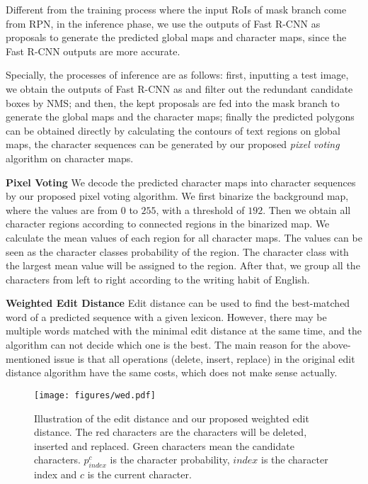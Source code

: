 \documentclass[runningheads]{llncs}
\begin{document}
Different from the training process where the input RoIs of mask branch come from RPN, in the inference phase, we use the outputs of Fast R-CNN as proposals to generate the predicted global maps and character maps, since the Fast R-CNN outputs are more accurate. 

Specially, the processes of inference are as follows: first, inputting a test image, we obtain the outputs of Fast R-CNN as \cite{ren2015faster} and filter out the redundant candidate boxes by NMS; and then, the kept proposals are fed into the mask branch to generate the global maps and the character maps; finally the predicted polygons can be obtained directly by calculating the contours of text regions on global maps, the character sequences can be generated by our proposed \textit{pixel voting} algorithm on character maps.










\noindent\textbf{Pixel Voting} We decode the predicted character maps into character sequences by our proposed pixel voting algorithm. We first binarize the background map, where the values are from $0$ to $255$, with a threshold of $192$. 
Then we obtain all character regions according to connected regions in the binarized map. We calculate the mean values of each region for all character maps. The values can be seen as the character classes probability of the region. The character class with the largest mean value will be assigned to the region. After that, we group all the characters from left to right according to the writing habit of English. 

\noindent\textbf{Weighted Edit Distance} Edit distance can be used to find the best-matched word of a predicted sequence with a given lexicon. However, there may be multiple words matched with the minimal edit distance at the same time, and the algorithm can not decide which one is the best. The main reason for the above-mentioned issue is that all operations (delete, insert, replace) in the original edit distance algorithm have the same costs, which does not make sense actually. 


\begin{figure}[!bp]
\begin{center}
\texttt{[image: figures/wed.pdf]}
\end{center}
\caption{Illustration of the edit distance and our proposed weighted edit distance. The red characters are the characters will be deleted, inserted and replaced. Green characters mean the candidate characters. $p_{index}^c$ is the character probability, $index$ is the character index and $c$ is the current character.}
\label{fig:wed}
\end{figure}
\end{document}

